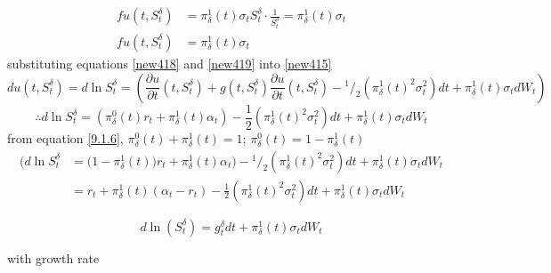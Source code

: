 \documentclass[a4 paper, 12pt]{report}
\newcommand*\rfrac[2]{{}^{#1}\!/_{#2}}
\theoremstyle{plain}
\begin{document}
\begin{equation}\label{new419}
\begin{split}
fu(t,S_t^\delta)& = \pi_\delta^1(t)\sigma_tS_t^\delta\cdot\frac{1}{S_t^\delta} = \pi_\delta^1(t)\sigma_t\\
fu(t,S_t^\delta)& = \pi_\delta^1(t)\sigma_t
\end{split}
\end{equation}
substituting  equations \eqref{new418} and \eqref{new419} into \eqref{new415}
$$
du(t,S_t^\delta) = d\ln S_t^\delta = (\frac{\partial u}{\partial t}(t,S_t^\delta)+g(t,S_t^\delta)\frac{\partial u}{\partial t}(t,S_t^\delta) - \rfrac{1}{2}(\pi^1_\delta(t)^2\sigma_t^2)dt+\pi^1_\delta(t)\sigma_tdW_t)
$$
$$
\therefore d\ln S_t^\delta = (\pi_\delta^0(t)r_t+\pi_\delta^1(t)\alpha_t) - \frac{1}{2}(\pi^1_\delta(t)^2\sigma_t^2)dt+\pi_\delta^1(t)\sigma_tdW_t
$$
from equation \eqref{9.1.6}, $\pi_\delta^0(t)+\pi_\delta^1(t) = 1$; $\pi_\delta^0(t) = 1-\pi_\delta^1(t)$
\begin{equation}
\begin{split}
\bigg(d\ln S_t^\delta & = \bigg(1-\pi_\delta^1(t)\bigg)r_t+\pi_\delta^1(t)\alpha_t\bigg) - \rfrac{1}{2}(\pi^1_\delta(t)^2\sigma_t^2)dt+\pi_\delta^1(t)\sigma_tdW_t\\
& = r_t+\pi_\delta^1(t)(\alpha_t - r_t)-\frac{1}{2}(\pi_\delta^1(t)^2\sigma^2_t)dt+\pi_\delta^1(t)\sigma_tdW_t
\end{split}
\end{equation}


\begin{equation}\label{9.1.8}
d\ln(S_t^\delta) = g_t^\delta dt+\pi_\delta^1(t)\sigma_tdW_t
\end{equation}

with growth rate
\end{document}
